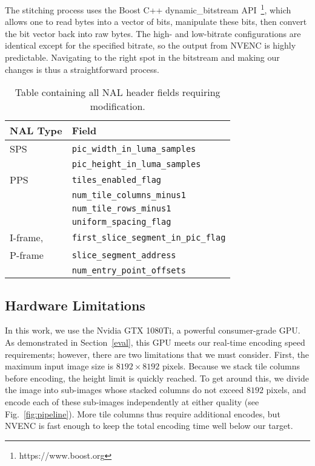 The stitching process uses the Boost C++ dynamic\_bitstream API~\footnote{https://www.boost.org}, which allows one to read bytes into a vector of bits, manipulate these bits, then convert the bit vector back into raw bytes. The high- and low-bitrate configurations are identical except for the specified bitrate, so the output from NVENC is highly predictable. Navigating to the right spot in the bitstream and making our changes is thus a straightforward process.

\setcounter{figure}{1}
\begin{table}
	\begin{tabularx}{\columnwidth}{ll}
		\toprule
		NAL Type & Field \\
		\midrule
		SPS & \texttt{pic\_width\_in\_luma\_samples} \\
		 & \texttt{pic\_height\_in\_luma\_samples}  \\
		\midrule
		PPS & \texttt{tiles\_enabled\_flag}  \\
		& \texttt{num\_tile\_columns\_minus1}  \\
		& \texttt{num\_tile\_rows\_minus1}  \\
		& \texttt{uniform\_spacing\_flag}  \\
		\midrule
		I-frame, & \texttt{first\_slice\_segment\_in\_pic\_flag} \\
		P-frame & \texttt{slice\_segment\_address}  \\
		& \texttt{num\_entry\_point\_offsets}  \\
		\bottomrule
	\end{tabularx}
	\caption{Table containing all NAL header fields requiring modification.}
\label{tab:stitch}
\end{table}
\renewcommand{\figurename}{Fig.}
\setcounter{figure}{1}

\subsection{Hardware Limitations}

In this work, we use the Nvidia GTX 1080Ti, a powerful consumer-grade GPU. As demonstrated in Section~\ref{eval}, this GPU meets our real-time encoding speed requirements; however, there are two limitations that we must consider.
%
First, the maximum input image size is $8192\times8192$ pixels. Because we stack tile columns before encoding, the height limit is quickly reached. To get around this, we divide the image into sub-images whose stacked columns do not exceed $8192$ pixels, and encode each of these sub-images independently at either quality (see Fig.~\ref{fig:pipeline}). More tile columns thus require additional encodes, but NVENC is fast enough to keep the total encoding time well below our target.

